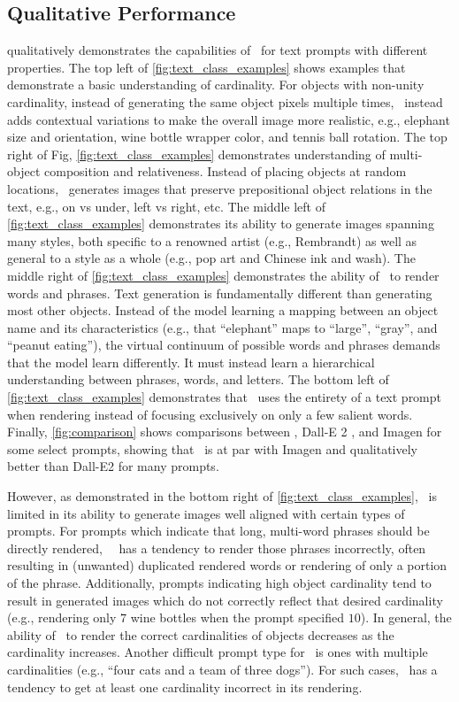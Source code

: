 \subsection{Qualitative Performance}

 qualitatively demonstrates the capabilities of \name~for text prompts with different properties. The top left of \cref{fig:text_class_examples} shows examples that demonstrate a basic understanding of cardinality. For objects with non-unity cardinality, instead of generating the same object pixels multiple times, \name~instead adds contextual variations to make the overall image more realistic, e.g., elephant size and orientation, wine bottle wrapper color, and tennis ball rotation. The top right of Fig, \ref{fig:text_class_examples} demonstrates understanding of multi-object composition and relativeness. Instead of placing objects at random locations, \name~generates images that preserve prepositional object relations in the text, e.g., on vs under, left vs right, etc. The middle left of \cref{fig:text_class_examples} demonstrates its ability to generate images spanning many styles, both specific to a renowned artist (e.g., Rembrandt) as well as general to a style as a whole (e.g., pop art and Chinese ink and wash). The middle right of \cref{fig:text_class_examples} demonstrates the ability of \name~to render words and phrases. Text generation is fundamentally different than generating most other objects. Instead of the model learning a mapping between an object name and its characteristics (e.g., that ``elephant'' maps to ``large'', ``gray'', and ``peanut eating''), the virtual continuum of possible words and phrases demands that the model learn differently. It must instead learn a hierarchical understanding between phrases, words, and letters. The bottom left of \cref{fig:text_class_examples} demonstrates that \name~uses the entirety of a text prompt when rendering instead of focusing exclusively on only a few salient words. Finally, \cref{fig:comparison} shows comparisons between \name, Dall-E 2 \citep{dalle2}, and Imagen \citep{imagen} for some select prompts, showing that \name~is at par with Imagen and qualitatively better than Dall-E2 for many prompts.

However, as demonstrated in the bottom right of \cref{fig:text_class_examples}, \name~is limited in its ability to generate images well aligned with certain types of prompts. For prompts which indicate that long, multi-word phrases should be directly rendered, ~\name~has a tendency to render those phrases incorrectly, often resulting in (unwanted) duplicated rendered words or rendering of only a portion of the phrase. Additionally, prompts indicating high object cardinality tend to result in generated images which do not correctly reflect that desired cardinality (e.g., rendering only $7$ wine bottles when the prompt specified $10$). In general, the ability of \name~to render the correct cardinalities of objects decreases as the cardinality increases. Another difficult prompt type for \name~is ones with multiple cardinalities (e.g., ``four cats and a team of three dogs''). For such cases, \name~has a tendency to get at least one cardinality incorrect in its rendering.

